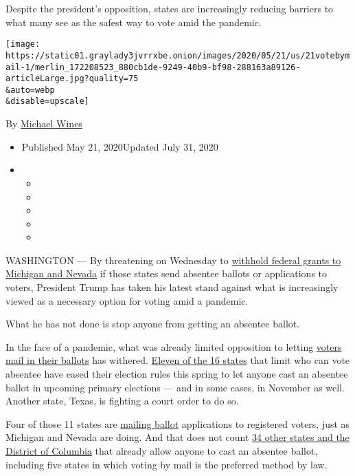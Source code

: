 Despite the president's opposition, states are increasingly reducing
barriers to what many see as the safest way to vote amid the pandemic.

\texttt{[image: https://static01.graylady3jvrrxbe.onion/images/2020/05/21/us/21votebymail-1/merlin\_172208523\_880cb1de-9249-40b9-bf98-288163a89126-articleLarge.jpg?quality=75\\\&auto=webp\\\&disable=upscale]}

By \href{https://www.nytimes3xbfgragh.onion/by/michael-wines}{Michael
Wines}

\begin{itemize}
\item
  Published May 21, 2020Updated July 31, 2020
\item
  \begin{itemize}
  \item
  \item
  \item
  \item
  \item
  \end{itemize}
\end{itemize}

WASHINGTON --- By threatening on Wednesday to
\href{https://www.nytimes3xbfgragh.onion/2020/05/20/us/politics/trump-michigan-vote-by-mail.html}{withhold
federal grants to Michigan and Nevada} if those states send absentee
ballots or applications to voters, President Trump has taken his latest
stand against what is increasingly viewed as a necessary option for
voting amid a pandemic.

What he has not done is stop anyone from getting an absentee ballot.

In the face of a pandemic, what was already limited opposition to
letting
\href{https://www.nytimes3xbfgragh.onion/2020/08/03/us/politics/trump-mail-in-voting.html}{voters
mail in their ballots} has withered.
\href{https://ballotpedia.org/Changes_to_absentee/mail-in_voting_procedures_in_response_to_the_coronavirus_(COVID-19)_pandemic,_2020}{Eleven
of the 16 states} that limit who can vote absentee have eased their
election rules this spring to let anyone cast an absentee ballot in
upcoming primary elections --- and in some cases, in November as well.
Another state, Texas, is fighting a court order to do so.

Four of those 11 states are
\href{https://www.nytimes3xbfgragh.onion/2020/06/02/us/politics/republicans-mail-voting-trump.html}{mailing
ballot} applications to registered voters, just as Michigan and Nevada
are doing. And that does not count
\href{https://www.brennancenter.org/our-work/research-reports/preparing-your-state-election-under-pandemic-conditions}{34
other states and the District of Columbia} that already allow anyone to
cast an absentee ballot, including five states in which voting by mail
is the preferred method by law.


